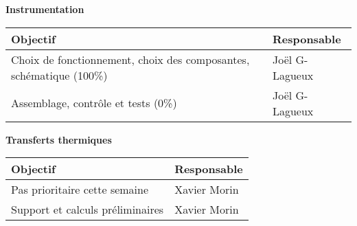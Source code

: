 \textbf{\large Instrumentation}\\
\begin{tabularx}{\linewidth}{
    |>{\hsize=1.75\hsize}X|%
    >{\hsize=0.25\hsize}X|%
  }
    \hline
    \textbf{Objectif} & \textbf{Responsable} \\\hline
    Choix de fonctionnement, choix des composantes, schématique (100\%)  & Joël G-Lagueux \\\hline 
    Assemblage, contrôle et tests (0\%) &  Joël G-Lagueux\\\hline
\end{tabularx}
\medskip

\textbf{\large Transferts thermiques}\\
\begin{tabularx}{\linewidth}{
    |>{\hsize=1.75\hsize}X|%
    >{\hsize=0.25\hsize}X|%
  }
    \hline
    \textbf{Objectif} & \textbf{Responsable} \\\hline
    Pas prioritaire cette semaine & Xavier Morin \\\hline
    Support et calculs préliminaires & Xavier Morin \\\hline
\end{tabularx}



%
%
%  
